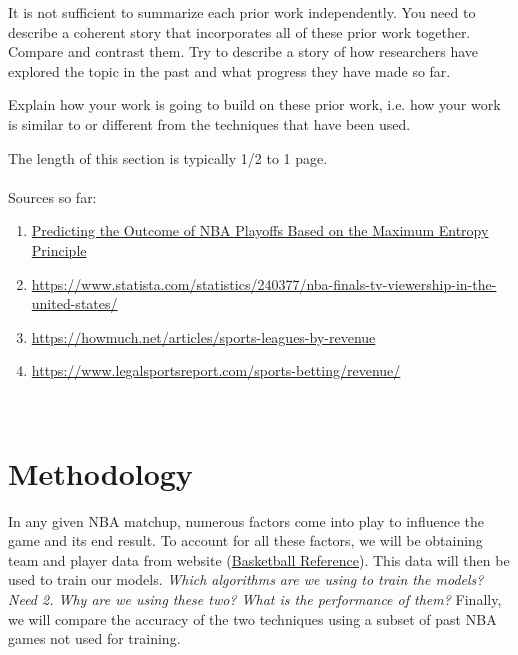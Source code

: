 \documentclass[letterpaper]{article} %
\begin{document}
It is not sufficient to summarize each prior work independently.  You need to describe a coherent story that incorporates all of these prior work together.  Compare and contrast them.  Try to describe a story of how researchers have explored the topic in the past and what progress they have made so far.  

Explain how your work is going to build on these prior work, i.e. how your work is similar to or different from the techniques that have been used.  

The length of this section is typically 1/2 to 1 page.
\\ \\
Sources so far:
\\
\begin{enumerate}
\item
\href{https://www.researchgate.net/publication/312236952_Predicting_the_Outcome_of_NBA_Playoffs_Based_on_the_Maximum_Entropy_Principle}{Predicting the Outcome of NBA Playoffs Based on the Maximum Entropy Principle}

\item \href{https://www.statista.com/statistics/240377/nba-finals-tv-viewership-in-the-united-states/}{https://www.statista.com/statistics/240377/nba-finals-tv-viewership-in-the-united-states/}
\item \href{https://howmuch.net/articles/sports-leagues-by-revenue}{https://howmuch.net/articles/sports-leagues-by-revenue}
\item \href{https://www.legalsportsreport.com/sports-betting/revenue/}{https://www.legalsportsreport.com/sports-betting/revenue/}

\end{enumerate}
\

\section{Methodology}

In any given NBA matchup, numerous factors come into play to influence the game and its end result. To account for all these factors, we will be obtaining team and player data from website (\href{https://www.basketball-reference.com/}{Basketball Reference}). This data will then be used to train our models. { \it Which algorithms are we using to train the models? Need 2. Why are we using these two? What is the performance of them? }  Finally, we will compare the accuracy of the two techniques using a subset of past NBA games not used for training.
\end{document}
